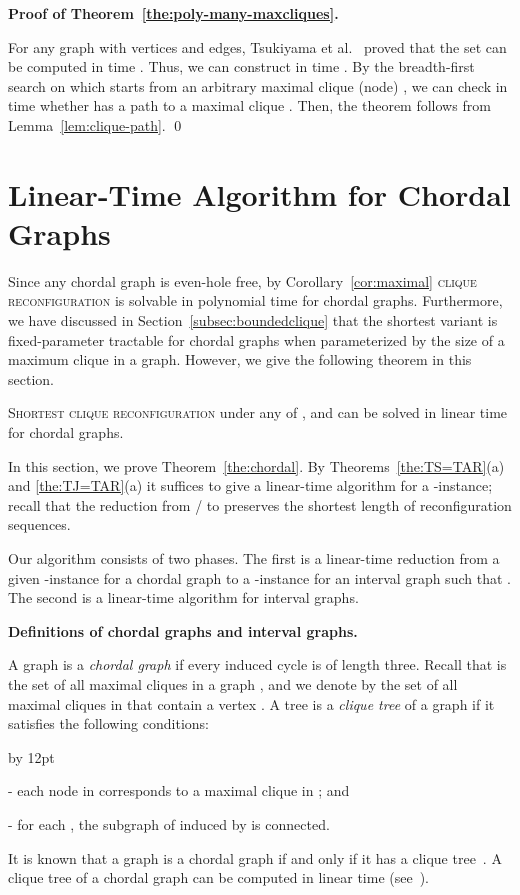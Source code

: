 \documentclass{llncs}
\newenvironment{listing}[1]{\begin{list}{*}{\settowidth{\labelwidth}{#1}\setlength{\leftmargin}{\labelwidth}\advance \leftmargin by 12pt
\setlength{\itemsep}{0pt}\setlength{\parsep}{0pt}\setlength{\topsep}{0pt}\setlength{\parskip}{0pt}}}{\end{list}}
\newcounter{two}
\newcounter{three}
\begin{document}
	\noindent
	{\bf Proof of Theorem~\ref{the:poly-many-maxcliques}.}

	For any graph  with  vertices and  edges, Tsukiyama et al.~\cite{TsukiyamaIAS77} proved that the set  can be computed in time .
	Thus, we can construct  in time .
	By the breadth-first search on  which starts from an arbitrary maximal clique (node) , we can check in time  whether  has a path to a maximal clique .
	Then, the theorem follows from Lemma~\ref{lem:clique-path}.
	\qed









	\section{Linear-Time Algorithm for Chordal Graphs}
	\label{sec:chordal}
	
	Since any chordal graph is even-hole free, by Corollary~\ref{cor:maximal} \textsc{clique reconfiguration} is solvable in polynomial time for chordal graphs. 
	Furthermore, we have discussed in Section~\ref{subsec:boundedclique} that the shortest variant is fixed-parameter tractable for chordal graphs when parameterized by the size of a maximum clique in a graph. 
	However, we give the following theorem in this section.
	\begin{theorem} \label{the:chordal}
	\textsc{Shortest clique reconfiguration} under any of ,  and  can be solved in linear time for chordal graphs. 
	\end{theorem}

	In this section, we prove Theorem~\ref{the:chordal}. 
	By Theorems~\ref{the:TS=TAR}(a) and \ref{the:TJ=TAR}(a) it suffices to give a linear-time algorithm for a -instance;
recall that the reduction from / to  preserves the shortest length of reconfiguration sequences.

	Our algorithm consists of two phases.
The first is a linear-time reduction from a given -instance  for a chordal graph  to a -instance  for an interval graph  such that . 
	The second is a linear-time algorithm for interval graphs.


\medskip

\noindent
	{\bf Definitions of chordal graphs and interval graphs.}

	A graph is a \emph{chordal graph} if every induced cycle is of length three.
	Recall that  is the set of all maximal cliques in a graph , and we denote by  the set of all maximal cliques in  that contain a vertex . 
A tree  is a  \emph{clique tree} of a graph  if it satisfies the following conditions:
	\begin{listing}{aa}
	\item[-] each node in  corresponds to a maximal clique in ; and 
	\item[-] for each , the subgraph of  induced by  is connected.
	\end{listing}
	It is known that a graph is a chordal graph if and only if it has a clique tree~\cite{Gavril74}.
	A clique tree of a chordal graph can be computed in linear time (see~\cite[\S 15.1]{Spinrad03}).
\end{document}

